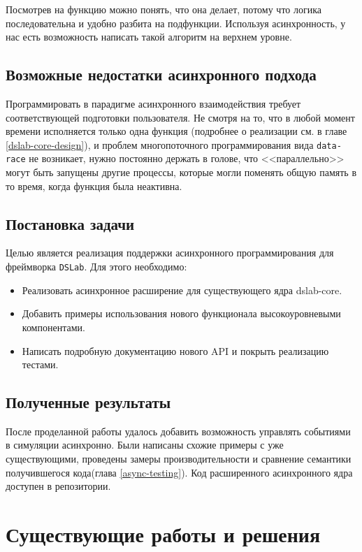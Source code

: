 Посмотрев на функцию можно понять, что она делает, потому что логика последовательна и удобно разбита на подфункции. Используя асинхронность, у нас есть возможность написать такой алгоритм на верхнем уровне. 

\subsection{Возможные недостатки асинхронного подхода}

Программировать в парадигме асинхронного взаимодействия требует соответствующей подготовки пользователя. Не смотря на то, что в любой момент времени исполняется только одна функция (подробнее о реализации см. в главе \ref{dslab-core-design}), и проблем многопоточного программирования вида \texttt{data-race} не возникает, нужно постоянно держать в голове, что <<параллельно>> могут быть запущены другие процессы, которые могли поменять общую память в то время, когда функция была неактивна. 

\subsection{Постановка задачи}\label{main-purpose}
Целью является реализация поддержки асинхронного программирования для фреймворка \texttt{DSLab}. Для этого необходимо:
\begin{itemize}
    \item Реализовать асинхронное расширение для существующего ядра dslab-core.
    \item Добавить примеры использования нового функционала высокоуровневыми компонентами.
    \item Написать подробную документацию нового API и покрыть реализацию тестами.
\end{itemize}

\subsection{Полученные результаты}

После проделанной работы удалось добавить возможность управлять событиями в симуляции асинхронно. Были написаны схожие примеры с уже существующими, проведены замеры производительности и сравнение семантики получившегося кода(глава \ref{async-testing}). Код расширенного асинхронного ядра доступен в репозитории\cite{async-dslab-core}.


\section{Существующие работы и решения}

